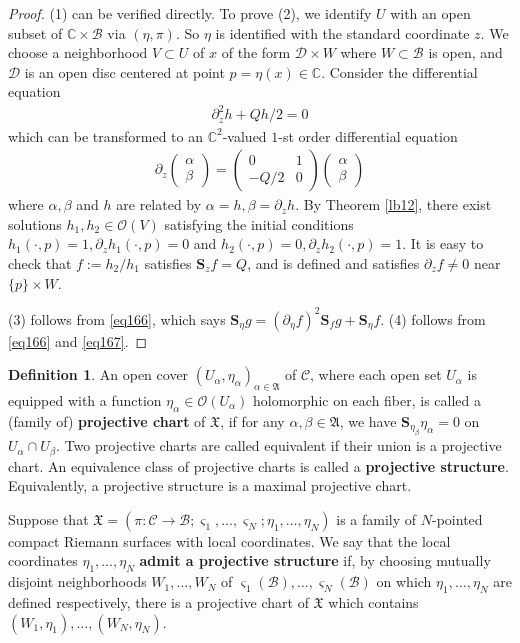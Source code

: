 \documentclass[12pt,a4paper,notitlepage]{report}
\theoremstyle{definition}
\newtheorem{df}{Definition}[section]
\theoremstyle{plain}
\newcommand{\fk}{\mathfrak}
\newcommand{\mc}{\mathcal}
\newcommand{\scr}{\mathscr}
\newcommand{\sgm}{\varsigma}
\newcommand{\Cbb}{\mathbb C}
\newcommand{\Sbf}{\mathbf{S}}
\numberwithin{equation}{section}
\begin{document}
\begin{proof}
(1) can be verified directly. To prove (2), we identify $U$ with an open subset of $\Cbb\times\mc B$ via $(\eta,\pi)$. So $\eta$ is identified with the standard coordinate $z$. We choose a neighborhood $V\subset U$ of $x$ of the form $\mc D\times W$ where $W\subset\mc B$ is open, and $\mc D$ is an open disc centered at point $p=\eta(x)\in\Cbb$. Consider the differential equation
\begin{align*}
\partial_z^2h+Qh/2=0
\end{align*}
which can be transformed to an $\Cbb^2$-valued $1$-st order differential equation
\begin{align*}
\partial_z
\begin{pmatrix}
\alpha\\
\beta
\end{pmatrix}
=
\begin{pmatrix}
0&1\\
-Q/2&0
\end{pmatrix}
\begin{pmatrix}
\alpha\\
\beta
\end{pmatrix}
\end{align*}
where $\alpha,\beta$ and $h$ are related by $\alpha=h,\beta=\partial_zh$. By Theorem \ref{lb12}, there exist solutions $h_1,h_2\in\scr O(V)$ satisfying  the initial conditions $h_1(\cdot,p)=1,\partial_z h_1(\cdot,p)=0$ and $h_2(\cdot,p)=0,\partial_z h_2(\cdot,p)=1$. It is easy to check that $f:=h_2/h_1$ satisfies $\Sbf_z f=Q$, and is defined and satisfies $\partial_zf\neq 0$ near $\{p\}\times W$.

(3) follows from \eqref{eq166}, which says $\Sbf_\eta g=(\partial_\eta f)^2\Sbf_fg+\Sbf_\eta f$. (4) follows from \eqref{eq166} and \eqref{eq167}.
\end{proof}


\begin{df}
An open cover $(U_\alpha,\eta_\alpha)_{\alpha\in\fk A}$ of $\mc C$, where each open set $U_\alpha$ is equipped with a function $\eta_\alpha\in\scr O(U_\alpha)$ holomorphic on each fiber, is called a (family of) \textbf{projective chart} of $\fk X$, if for any $\alpha,\beta\in\fk A$, we have $\Sbf_{\eta_\beta}\eta_\alpha=0$ on $U_\alpha\cap U_\beta$. Two projective charts are called equivalent if their union is a projective chart. An equivalence class of projective charts is called a \textbf{projective structure}. Equivalently, a projective structure is a maximal projective chart.

Suppose that $\fk X=(\pi:\mc C\rightarrow\mc B;\sgm_1,\dots,\sgm_N;\eta_1,\dots,\eta_N)$ is a family of $N$-pointed compact Riemann surfaces with local coordinates. We say that the local coordinates $\eta_1,\dots,\eta_N$ \textbf{admit a projective structure} if, by choosing mutually disjoint neighborhoods $W_1,\dots,W_N$ of $\sgm_1(\mc B),\dots,\sgm_N(\mc B)$ on which $\eta_1,\dots,\eta_N$ are defined respectively, there is a projective chart of $\fk X$ which contains $(W_1,\eta_1),\dots,(W_N,\eta_N)$.
\end{df}
\end{document}
